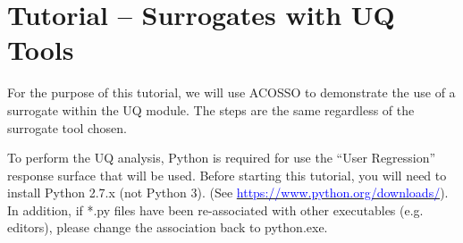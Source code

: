 \section{Tutorial -- Surrogates with UQ Tools}
\label{tutorial.surrogate.uq}

For the purpose of this tutorial, we will use ACOSSO to demonstrate the use
of a surrogate within the UQ module. The steps are the same regardless of
the surrogate tool chosen.

To perform the UQ analysis, Python is required for use the ``User Regression'' response surface that will be used.  Before starting this tutorial, you will need to install Python 2.7.x (not Python 3). (See \href{https://www.python.org/downloads/}{\textcolor{blue}{https://www.python.org/downloads/}}). In addition, if *.py files have been re-associated with other executables (e.g. editors), please change the association back to python.exe. 


